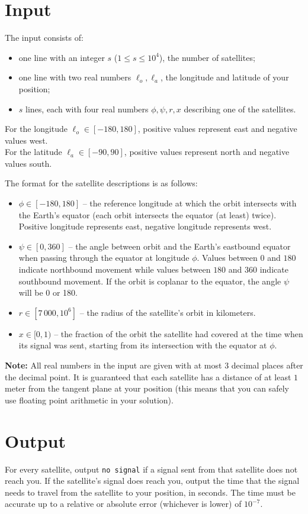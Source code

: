 \section*{Input}
The input consists of:
\begin{itemize}
  \item one line with an integer $s$ ($1 \le s \le 10^4$), the number of satellites;
  \item one line with two real numbers $\ell_o, \ell_a$, the longitude and latitude of your position;
  \item $s$ lines, each with four real numbers $\phi,\psi,r,x$ describing one of the satellites.
\end{itemize}

\noindent For the longitude $\ell_o\in[-180,180]$, positive values represent east and negative values west.\\
For the latitude $\ell_a\in[-90,90]$, positive values represent north and negative values south.

\noindent The format for the satellite descriptions is as follows:
\begin{itemize}
		\item $\phi \in [-180,180]$ -- the reference longitude at which the orbit intersects with the Earth's equator (each orbit intersects the equator (at least) twice).
				Positive longitude represents east, negative longitude represents west.
		\item $\psi \in [0,360]$ -- the angle between orbit and the Earth's eastbound equator when passing through the equator at longitude $\phi$.
				Values between $0$ and $180$ indicate northbound movement while values between $180$ and $360$ indicate southbound movement.
    			If the orbit is coplanar to the equator, the angle $\psi$ will be 0 or 180.
        \item $r \in [7\,000,10^6]$ -- the radius of the satellite's orbit in kilometers.
		\item $x \in [0,1)$ -- the fraction of the orbit the satellite had covered at the time when its signal was sent, starting from its intersection with the equator at $\phi$.
\end{itemize}

\textbf{Note:}
All real numbers in the input are given with at most $3$ decimal places after the decimal point.
It is guaranteed that each satellite has a distance of at least $1$ meter from the tangent plane at your position (this means that you can safely use floating point arithmetic in your solution).

\section*{Output}
For every satellite, output \texttt{no signal} if a signal sent from that satellite does not reach you.
If the satellite's signal does reach you, output the time that the signal needs to travel from the satellite to your position, in seconds.
The time must be accurate up to a relative or absolute error (whichever is lower) of $10^{-7}$.

